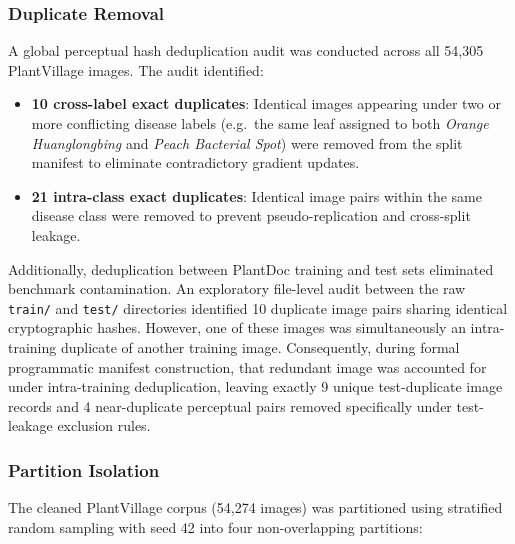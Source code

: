 \documentclass[pdflatex,sn-mathphys-num]{sn-jnl}
\theoremstyle{thmstyleone}%
\theoremstyle{thmstyletwo}%
\theoremstyle{thmstylethree}%
\begin{document}
\subsubsection{Duplicate Removal}

A global perceptual hash deduplication audit was conducted across all 54{,}305
PlantVillage images. The audit identified:
\begin{itemize}
  \item \textbf{10 cross-label exact duplicates}: Identical images appearing under two
        or more conflicting disease labels (e.g.\ the same leaf assigned to both
        \textit{Orange Huanglongbing} and \textit{Peach Bacterial Spot}) were removed
        from the split manifest to eliminate contradictory gradient updates.
  \item \textbf{21 intra-class exact duplicates}: Identical image pairs within the same
        disease class were removed to prevent pseudo-replication and cross-split leakage.
\end{itemize}

Additionally, deduplication between PlantDoc training and test sets eliminated benchmark contamination. An exploratory file-level audit between the raw \texttt{train/} and \texttt{test/} directories identified 10 duplicate image pairs sharing identical cryptographic hashes. However, one of these images was simultaneously an intra-training duplicate of another training image. Consequently, during formal programmatic manifest construction, that redundant image was accounted for under intra-training deduplication, leaving exactly 9 unique test-duplicate image records and 4 near-duplicate perceptual pairs removed specifically under test-leakage exclusion rules.

\subsubsection{Partition Isolation}

The cleaned PlantVillage corpus (54{,}274 images) was partitioned using stratified
random sampling with seed 42 into four non-overlapping partitions:
\end{document}

